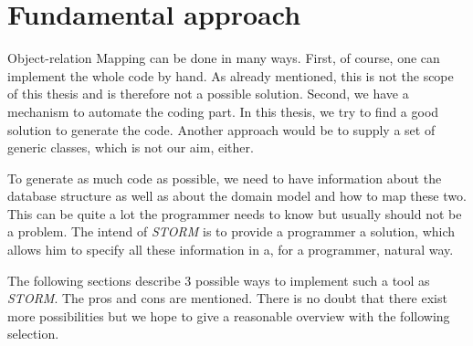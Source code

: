 \chapter{Fundamental approach}
	Object-relation Mapping can be done in many ways. First, of course, one can implement
	the whole code by hand. As already mentioned, this is not the scope of this thesis
	and is therefore not a possible solution. Second, we have a mechanism to
	automate the coding part. In this thesis, we try to find a good solution to
	generate the code. Another approach would be to supply a set of generic
	classes, which is not our aim, either.
	
	To generate as much code as possible, we need to have information about
	the database structure as well as about the domain model and how
	to map these two. This can be quite a lot the programmer needs to
	know but usually should not be a problem. The intend of \textit{STORM} is
	to provide a programmer a solution, which allows him to specify all these
	information in a, for a programmer, natural way.
	
	The following sections describe 3 possible ways to implement such a tool
	as \textit{STORM}. The pros and cons are mentioned. There is no doubt that
	there exist more possibilities but we hope to give a reasonable overview
	with the following selection.
	
